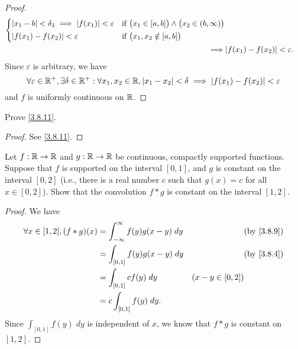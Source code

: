 \begin{proof}
\begin{align*}
\begin{dcases}
                 \abs{x_1 - b} < \delta_3 \implies \abs{f(x_1)} < \varepsilon & \text{if } \big(x_1 \in [a, b]\big) \land \big(x_2 \in (b, \infty)\big)  \\
                 \abs{f(x_1) - f(x_2)} < \varepsilon                          & \text{if } \big(x_1, x_2 \notin [a, b]\big)
               \end{dcases}            \\
    \implies & \abs{f(x_1) - f(x_2)} < \varepsilon.
  \end{align*}
  Since \(\varepsilon\) is arbitrary, we have
  \[
    \forall \varepsilon \in \mathbb{R}^+, \exists \delta \in \mathbb{R}^+ : \forall x_1, x_2 \in \mathbb{R}, \left\lvert x_1 - x_2\right\rvert < \delta \implies \left\lvert f(x_1) - f(x_2)\right\rvert < \varepsilon
  \]
  and \(f\) is uniformly continuous on \(\mathbb{R}\).
\end{proof}

\begin{ex}\label{ex:3.8.4}
  Prove \cref{3.8.11}.
\end{ex}

\begin{proof}
  See \cref{3.8.11}.
\end{proof}

\begin{ex}\label{ex:3.8.5}
  Let \(f : \mathbb{R} \to \mathbb{R}\) and \(g : \mathbb{R} \to \mathbb{R}\) be continuous, compactly supported functions.
  Suppose that \(f\) is supported on the interval \([0, 1]\), and \(g\) is constant on the interval \([0, 2]\)
  (i.e., there is a real number \(c\) such that \(g(x) = c\) for all \(x \in [0, 2]\)).
  Show that the convolution \(f * g\) is constant on the interval \([1, 2]\).
\end{ex}

\begin{proof}
  We have
  \begin{align*}
    \forall x \in [1, 2], (f * g)(x) & = \int_{-\infty}^\infty f(y) g(x - y) \; dy &                    & \by{3.8.9} \\
                                     & = \int_{[0, 1]} f(y) g(x - y) \; dy         &                    & \by{3.8.4} \\
                                     & = \int_{[0, 1]} c f(y) \; dy                & (x - y \in [0, 2])              \\
                                     & = c \int_{[0, 1]} f(y) \; dy.
  \end{align*}
  Since \(\int_{[0, 1]} f(y) \; dy\) is independent of \(x\), we know that \(f * g\) is constant on \([1, 2]\).
\end{proof}

